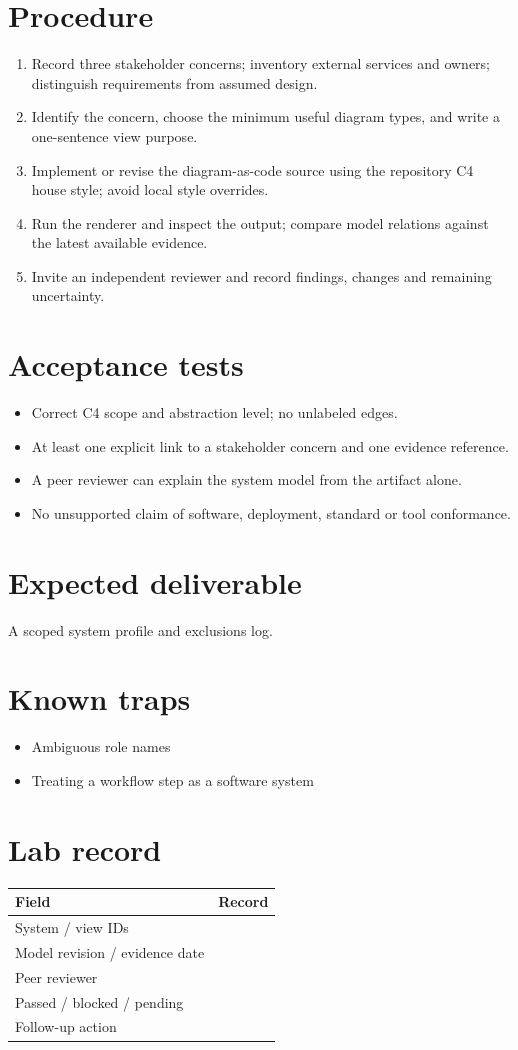 \documentclass[10pt,letterpaper]{article}
\begin{document}
\section{Procedure}
\begin{enumerate}
\item Record three stakeholder concerns; inventory external services and owners; distinguish requirements from assumed design.
\item Identify the concern, choose the minimum useful diagram types, and write a one-sentence view purpose.
\item Implement or revise the diagram-as-code source using the repository C4 house style; avoid local style overrides.
\item Run the renderer and inspect the output; compare model relations against the latest available evidence.
\item Invite an independent reviewer and record findings, changes and remaining uncertainty.
\end{enumerate}

\section{Acceptance tests}
\begin{itemize}
\item Correct C4 scope and abstraction level; no unlabeled edges.
\item At least one explicit link to a stakeholder concern and one evidence reference.
\item A peer reviewer can explain the system model from the artifact alone.
\item No unsupported claim of software, deployment, standard or tool conformance.
\end{itemize}

\section{Expected deliverable}
A scoped system profile and exclusions log.


\section{Known traps}
\begin{itemize}
\item Ambiguous role names
\item Treating a workflow step as a software system
\end{itemize}

\section{Lab record}
\begin{tabularx}{\linewidth}{@{}YY@{}}\toprule
\textbf{Field} & \textbf{Record} \\ \midrule
System / view IDs &  \\
Model revision / evidence date &  \\
Peer reviewer &  \\
Passed / blocked / pending &  \\
Follow-up action &  \\
\bottomrule\end{tabularx}
\end{document}

